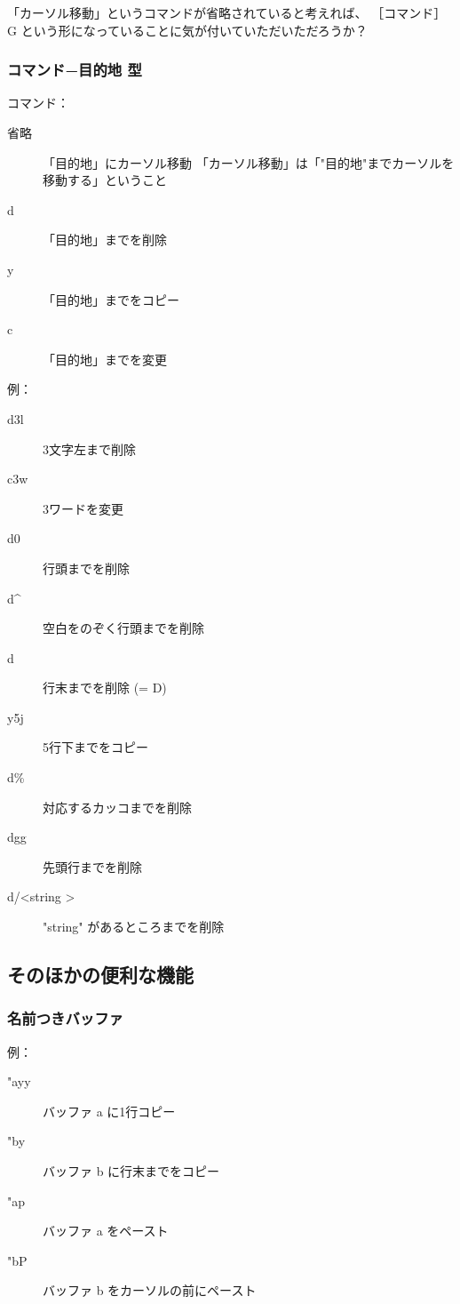 \documentclass[mingoth,a4paper]{jsarticle}
\begin{document}
「カーソル移動」というコマンドが省略されていると考えれば、
［コマンド］G という形になっていることに気が付いていただいただろうか？


\subsubsection{コマンド−目的地 型}


コマンド：
\begin{description}
  \item[省略] 「目的地」にカーソル移動
    「カーソル移動」は「"目的地"までカーソルを移動する」ということ
  \item[d] 「目的地」までを削除
  \item[y] 「目的地」までをコピー
  \item[c] 「目的地」までを変更
\end{description}

例：
\begin{description}
\item[d3l] 3文字左まで削除
\item[c3w] 3ワードを変更

\item[d0] 行頭までを削除
\item[d\textasciicircum] 空白をのぞく行頭までを削除
\item[d\textdollar] 行末までを削除 (= D)

\item[y5j] 5行下までをコピー
\item[d\%] 対応するカッコまでを削除
\item[dgg] 先頭行までを削除

\item[d/\textless string \textgreater] "string" があるところまでを削除
\end{description}

\subsection{そのほかの便利な機能}

\subsubsection{名前つきバッファ}

例：
\begin{description}
\item["ayy] バッファ a に1行コピー
\item["by\textdollar] バッファ b に行末までをコピー

\item["ap] バッファ a をペースト
\item["bP] バッファ b をカーソルの前にペースト
\end{description}
\end{document}
